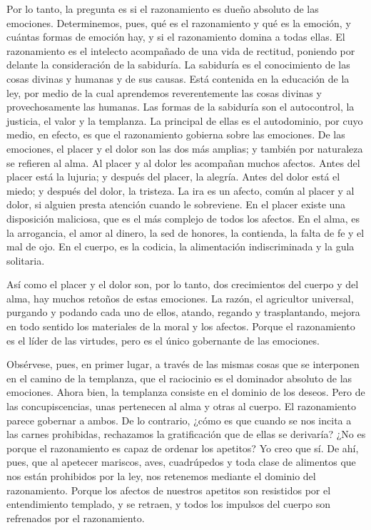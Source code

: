 Por lo tanto, la pregunta es si el razonamiento es dueño
absoluto de las emociones.  Determinemos, pues, qué es el
razonamiento y qué es la emoción, y cuántas formas de emoción hay, y si
el razonamiento domina a todas ellas.  El razonamiento es
el intelecto acompañado de una vida de rectitud, poniendo por delante la
consideración de la sabiduría.  La sabiduría es el
conocimiento de las cosas divinas y humanas y de sus causas.
 Está contenida en la educación de la ley, por medio de
la cual aprendemos reverentemente las cosas divinas y provechosamente
las humanas.  Las formas de la sabiduría son el
autocontrol, la justicia, el valor y la templanza.  La
principal de ellas es el autodominio, por cuyo medio, en efecto, es que
el razonamiento gobierna sobre las emociones.  De las
emociones, el placer y el dolor son las dos más amplias; y también por
naturaleza se refieren al alma.  Al placer y al dolor les
acompañan muchos afectos.  Antes del placer está la
lujuria; y después del placer, la alegría.  Antes del
dolor está el miedo; y después del dolor, la tristeza. 
La ira es un afecto, común al placer y al dolor, si alguien presta
atención cuando le sobreviene.  En el placer existe una
disposición maliciosa, que es el más complejo de todos los afectos.
 En el alma, es la arrogancia, el amor al dinero, la sed
de honores, la contienda, la falta de fe y el mal de ojo.
 En el cuerpo, es la codicia, la alimentación
indiscriminada y la gula solitaria.

 Así como el placer y el dolor son, por lo tanto, dos
crecimientos del cuerpo y del alma, hay muchos retoños de estas
emociones.  La razón, el agricultor universal, purgando y
podando cada uno de ellos, atando, regando y trasplantando, mejora en
todo sentido los materiales de la moral y los afectos. 
Porque el razonamiento es el líder de las virtudes, pero es el único
gobernante de las emociones.

Obsérvese, pues, en primer lugar, a través de las mismas cosas que se
interponen en el camino de la templanza, que el raciocinio es el
dominador absoluto de las emociones.  Ahora bien, la
templanza consiste en el dominio de los deseos.  Pero de
las concupiscencias, unas pertenecen al alma y otras al cuerpo. El
razonamiento parece gobernar a ambos.  De lo contrario,
¿cómo es que cuando se nos incita a las carnes prohibidas, rechazamos la
gratificación que de ellas se derivaría? ¿No es porque el razonamiento
es capaz de ordenar los apetitos? Yo creo que sí.  De
ahí, pues, que al apetecer mariscos, aves, cuadrúpedos y toda clase de
alimentos que nos están prohibidos por la ley, nos retenemos mediante el
dominio del razonamiento.  Porque los afectos de nuestros
apetitos son resistidos por el entendimiento templado, y se retraen, y
todos los impulsos del cuerpo son refrenados por el razonamiento.

